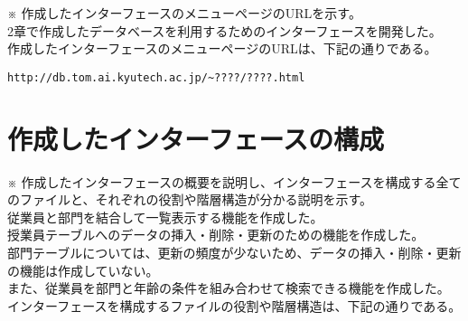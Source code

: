 \documentclass[a4j,12pt]{jreport}
\begin{document}
※ 作成したインターフェースのメニューページのURLを示す。\\

2章で作成したデータベースを利用するためのインターフェースを開発した。\\
作成したインターフェースのメニューページのURLは、下記の通りである。

\begin{verbatim}
http://db.tom.ai.kyutech.ac.jp/~????/????.html
\end{verbatim}


\section{作成したインターフェースの構成}

※ 作成したインターフェースの概要を説明し、インターフェースを構成する全てのファイルと、それぞれの役割や階層構造が分かる説明を示す。\\

従業員と部門を結合して一覧表示する機能を作成した。\\
授業員テーブルへのデータの挿入・削除・更新のための機能を作成した。\\
部門テーブルについては、更新の頻度が少ないため、データの挿入・削除・更新の機能は作成していない。\\
また、従業員を部門と年齢の条件を組み合わせて検索できる機能を作成した。\\
インターフェースを構成するファイルの役割や階層構造は、下記の通りである。
\end{document}
